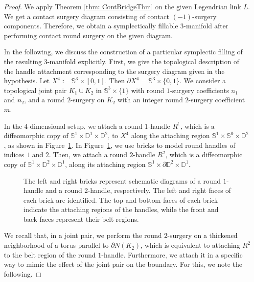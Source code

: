 \documentclass[10pt,a4paper]{amsart}
\newcommand{\D}{\mathbb{D}}
\newcommand{\dd}{\partial}
\newcommand{\s}{\mathbb{S}}
\begin{document}
\begin{proof}
    We apply Theorem \ref{thm: ContBridgeThm} on the given Legendrian link $L$. 
    We get a contact surgery diagram consisting of contact $(-1)$-surgery components. 
    Therefore, we obtain a symplectically fillable 3-manifold after performing contact round surgery on the given diagram. 

    In the following, we discuss the construction of a particular symplectic filling of the resulting 3-manifold explicitly.
 First, we give the topological description of the handle attachment corresponding to the surgery diagram given in the hypothesis.
Let $X^4 := \s^3 \times [0,1]$. Then $\dd X^4= \s^3\times \{0,1\}$. 
We consider a topological joint pair $K_1 \cup K_2$ in $\s^3\times \{1\}$ with round $1$-surgery coefficients $n_{1}$ and $n_{2}$, and a round $2$-surgery on $K_{2}$ with an integer round $2$-surgery coefficient $m$.



In the $4$-dimensional setup, we attach a round $1$-handle $R^{1}$, which is a diffeomorphic copy of $\s^1\times \D^1\times \D^2$, to $X^4$ along the attaching region $\s^{1} \times \s^{0} \times \D^{2}$, as shown in Figure~\ref{fig: R1,2H}. 
In Figure~\ref{fig: R1,2H}, we use bricks to model round handles of indices $1$ and $2$. 
Then, we attach a round $2$-handle $R^{2}$, which is a diffeomorphic copy of $\s^{1} \times \D^{2} \times \D^{1}$, along its attaching region $\s^{1} \times \partial \D^{2} \times \D^{1}$.

\begin{figure}[ht]
    \centering
    
    \caption{The left and right bricks represent schematic diagrams of a round $1$-handle and a round $2$-handle, respectively. The left and right faces of each brick are identified. The top and bottom faces of each brick indicate the attaching regions of the handles, while the front and back faces represent their belt regions.}
    \label{fig: R1,2H}
\end{figure}

We recall that, in a joint pair, we perform the round $2$-surgery on a thickened neighborhood of a torus parallel to $\partial N(K_{2})$, which is equivalent to attaching $R^{2}$ to the belt region of the round $1$-handle. 
Furthermore, we attach it in a specific way to mimic the effect of the joint pair on the boundary. For this, we note the following.


\end{proof}
\end{document}
